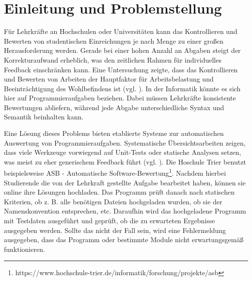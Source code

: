 \chapter{Einleitung und Problemstellung}




Für Lehrkräfte an Hochschulen oder Universitäten kann das Kontrollieren und Bewerten von studentischen Einreichungen je nach Menge zu einer großen Herausforderung werden. Gerade bei einer hohen Anzahl an Abgaben steigt der Korrekturaufwand erheblich, was den zeitlichen Rahmen für individuelles Feedback einschränken kann. Eine Untersuchung zeigte, dass das Kontrollieren und Bewerten von Arbeiten der Hauptfaktor für Arbeitsbelastung und Beeinträchtigung des Wohlbefindens ist (vgl. \cite{Jerrim.2021}). In der Informatik könnte es sich hier auf Programmieraufgaben beziehen. Dabei müssen Lehrkräfte konsistente Bewertungen abliefern, während jede Abgabe unterschiedliche Syntax und Semantik beinhalten kann.

Eine Lösung dieses Problems bieten etablierte Systeme zur automatischen Auswertung von Programmieraufgaben. Systematische Übersichtsarbeiten zeigen, dass viele Werkzeuge vorwiegend auf Unit-Tests oder statische Analysen setzen, was meist zu eher generischem Feedback führt (vgl. \cite{Messer.2023}). Die Hoschule Trier benutzt beispielsweise ASB - Automatische Software-Bewertung\footnote{https://www.hochschule-trier.de/informatik/forschung/projekte/asb}. Nachdem hierbei Studierende die von der Lehrkraft gestellte Aufgabe bearbeitet haben, können sie online ihre Lösungen hochladen. Das Programm prüft danach nach statischen Kriterien, ob z. B. alle benötigen Dateien hochgeladen wurden, ob sie der Namenskonvention entsprechen, etc. Daraufhin wird das hochgeladene Programm mit Testdaten ausgeführt und geprüft, ob die zu erwarteten Ergebnisse ausgegeben werden. Sollte das nicht der Fall sein, wird eine Fehlermeldung ausgegeben, dass das Programm oder bestimmte Module nicht erwartungsgemäß funktionieren. 

